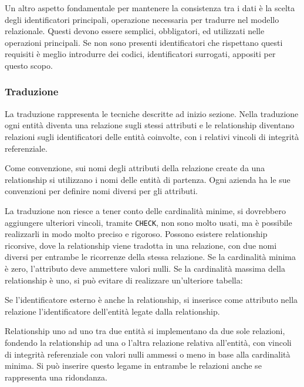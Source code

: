 \documentclass{article}
\numberwithin{equation}{subsection}
\begin{document}
Un altro aspetto fondamentale per mantenere la consistenza tra i dati è la scelta degli identificatori principali, operazione necessaria per tradurre nel modello relazionale. 
Questi devono essere semplici, obbligatori, ed utilizzati nelle operazioni principali. Se non sono presenti identificatori che rispettano questi requisiti è meglio introdurre dei codici, identificatori surrogati, appositi per questo scopo. 

\subsubsection{Traduzione}

La traduzione rappresenta le tecniche descritte ad inizio sezione. 
Nella traduzione ogni entità diventa una relazione sugli stessi attributi e le relationship diventano relazioni sugli identificatori delle entità coinvolte, con i relativi vincoli di integrità referenziale. 

Come convenzione, sui nomi degli attributi della relazione create da una relationship si utilizzano i nomi delle entità di partenza. Ogni azienda ha le sue convenzioni 
per definire nomi diversi per gli attributi. 

La traduzione non riesce a tener conto delle cardinalità minime, si dovrebbero aggiungere ulteriori vincoli, tramite \verb|CHECK|, non sono molto usati, ma è possibile 
realizzarli in modo molto preciso e rigoroso. 
Possono esistere relationship ricorsive, dove la relationship viene tradotta in una relazione, con due nomi diversi per 
entrambe le ricorrenze della stessa relazione. 
Se la cardinalità minima è zero, l'attributo deve ammettere valori nulli. Se la cardinalità massima della relationship è uno, si può evitare di realizzare un'ulteriore tabella:

Se l'identificatore esterno è anche la relationship, si inserisce come attributo nella relazione l'identificatore dell'entità legate dalla relationship. 

Relationship uno ad uno tra due entità si implementano da due sole relazioni, fondendo la relationship ad una o l'altra relazione relativa all'entità, con vincoli di integrità referenziale con valori nulli ammessi o meno in base alla cardinalità minima. Si può inserire questo legame in entrambe le relazioni anche se rappresenta una ridondanza. 
\end{document}
